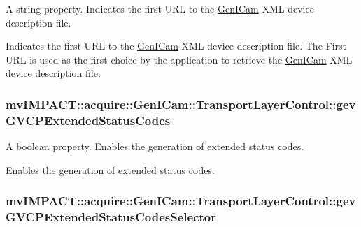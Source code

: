 A string property. Indicates the first U\+R\+L to the \hyperlink{namespacemv_i_m_p_a_c_t_1_1acquire_1_1_gen_i_cam}{Gen\+I\+Cam} X\+M\+L device description file. 

Indicates the first U\+R\+L to the \hyperlink{namespacemv_i_m_p_a_c_t_1_1acquire_1_1_gen_i_cam}{Gen\+I\+Cam} X\+M\+L device description file. The First U\+R\+L is used as the first choice by the application to retrieve the \hyperlink{namespacemv_i_m_p_a_c_t_1_1acquire_1_1_gen_i_cam}{Gen\+I\+Cam} X\+M\+L device description file. \hypertarget{classmv_i_m_p_a_c_t_1_1acquire_1_1_gen_i_cam_1_1_transport_layer_control_acd44dca38d93bcd521d33b2254f84716}{
\subsubsection[{gev\+G\+V\+C\+P\+Extended\+Status\+Codes}]{ mv\+I\+M\+P\+A\+C\+T\+::acquire\+::\+Gen\+I\+Cam\+::\+Transport\+Layer\+Control\+::gev\+G\+V\+C\+P\+Extended\+Status\+Codes}}\label{classmv_i_m_p_a_c_t_1_1acquire_1_1_gen_i_cam_1_1_transport_layer_control_acd44dca38d93bcd521d33b2254f84716}


A boolean property. Enables the generation of extended status codes. 

Enables the generation of extended status codes. \hypertarget{classmv_i_m_p_a_c_t_1_1acquire_1_1_gen_i_cam_1_1_transport_layer_control_a4d89460b444cb1579229c34e9d4c2e0a}{
\subsubsection[{gev\+G\+V\+C\+P\+Extended\+Status\+Codes\+Selector}]{ mv\+I\+M\+P\+A\+C\+T\+::acquire\+::\+Gen\+I\+Cam\+::\+Transport\+Layer\+Control\+::gev\+G\+V\+C\+P\+Extended\+Status\+Codes\+Selector}}\label{classmv_i_m_p_a_c_t_1_1acquire_1_1_gen_i_cam_1_1_transport_layer_control_a4d89460b444cb1579229c34e9d4c2e0a}


